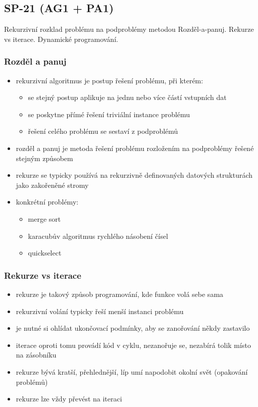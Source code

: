 \subsection{SP-21 (AG1 + PA1)}
Rekurzivní rozklad problému na podproblémy metodou Rozděl-a-panuj. Rekurze vs iterace. Dynamické programování.

\subsubsection*{Rozděl a panuj}
\begin{itemize}
	\item rekurzivní algoritmus je postup řešení problému, při kterém:
	\begin{itemize}
		\item se stejný postup aplikuje na jednu nebo více částí vstupních dat
		\item se poskytne přímé řešení triviální instance problému
		\item řešení celého problému se sestaví z podproblémů
	\end{itemize}
	\item rozděl a panuj je metoda řešení problému rozložením na podproblémy řešené stejným způsobem
	\item rekurze se typicky používá na rekurzivně definovaných datových strukturách jako zakořeněné stromy
	\item konkrétní problémy:
	\begin{itemize}
		\item merge sort
		\item karacubův algoritmus rychlého násobení čísel
		\item quickselect
	\end{itemize}
\end{itemize}

\subsubsection*{Rekurze vs iterace}
\begin{itemize}
	\item rekurze je takový způsob programování, kde funkce volá sebe sama
	\item rekurzivní volání typicky řeší menší instanci problému
	\item je nutné si ohlídat ukončovací podmínky, aby se zanořování někdy zastavilo
	\item iterace oproti tomu provádí kód v cyklu, nezanořuje se, nezabírá tolik místo na zásobníku
	\item rekurze bývá kratší, přehlednější, líp umí napodobit okolní svět (opakování problémů)
	\item rekurze lze vždy převést na iteraci
\end{itemize}

